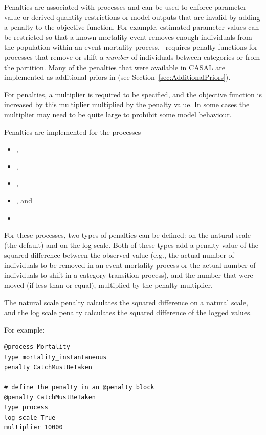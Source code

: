 Penalties are associated with processes and can be used to enforce parameter value or derived quantity restrictions or model outputs that are invalid by adding a penalty to the objective function. For example, estimated parameter values can be restricted so that a known mortality event removes enough individuals from the population within an event mortality process. \CNAME\ requires penalty functions for processes that remove or shift a \emph{number} of individuals between categories or from the partition. Many of the penalties that were available in CASAL are implemented as additional priors in \CNAME (see Section~\ref{sec:AdditionalPriors}).

For penalties, a multiplier is required to be specified, and the objective function is increased by this multiplier multiplied by the penalty value. In some cases the multiplier may need to be quite large to prohibit some model behaviour.

Penalties are implemented for the processes

\begin{itemize}
	\item {},
	\item {},
	\item {},
	\item {}, and
	\item {}
\end{itemize}

For these processes, two types of penalties can be defined: on the natural scale (the default) and on the log scale. Both of these types add a penalty value of the squared difference between the observed value (e.g., the actual number of individuals to be removed in an event mortality process or the actual number of individuals to shift in a category transition process), and the number that were moved (if less than or equal), multiplied by the penalty multiplier.

The natural scale penalty calculates the squared difference on a natural scale, and the log scale penalty calculates the squared difference of the logged values.

For example:

{\small{\begin{verbatim}
@process Mortality
type mortality_instantaneous
penalty CatchMustBeTaken

# define the penalty in an @penalty block
@penalty CatchMustBeTaken
type process
log_scale True
multiplier 10000
\end{verbatim}}}

